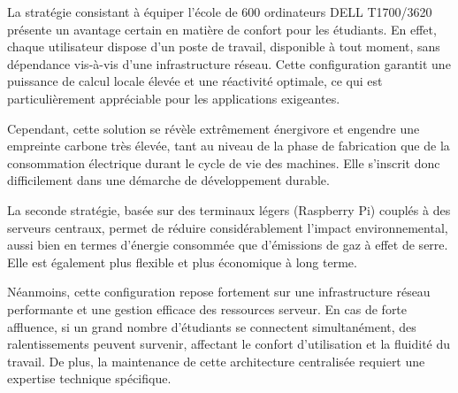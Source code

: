 La stratégie consistant à équiper l’école de 600 ordinateurs DELL T1700/3620 présente un avantage certain en matière de confort pour les étudiants. En effet, chaque utilisateur dispose d’un poste de travail, disponible à tout moment, sans dépendance vis-à-vis d’une infrastructure réseau. Cette configuration garantit une puissance de calcul locale élevée et une réactivité optimale, ce qui est particulièrement appréciable pour les applications exigeantes.

Cependant, cette solution se révèle extrêmement énergivore et engendre une empreinte carbone très élevée, tant au niveau de la phase de fabrication que de la consommation électrique durant le cycle de vie des machines. Elle s’inscrit donc difficilement dans une démarche de développement durable.



La seconde stratégie, basée sur des terminaux légers (Raspberry Pi) couplés à des serveurs centraux, permet de réduire considérablement l’impact environnemental, aussi bien en termes d’énergie consommée que d’émissions de gaz à effet de serre. Elle est également plus flexible et plus économique à long terme.

Néanmoins, cette configuration repose fortement sur une infrastructure réseau performante et une gestion efficace des ressources serveur. En cas de forte affluence, si un grand nombre d’étudiants se connectent simultanément, des ralentissements peuvent survenir, affectant le confort d’utilisation et la fluidité du travail. De plus, la maintenance de cette architecture centralisée requiert une expertise technique spécifique.
